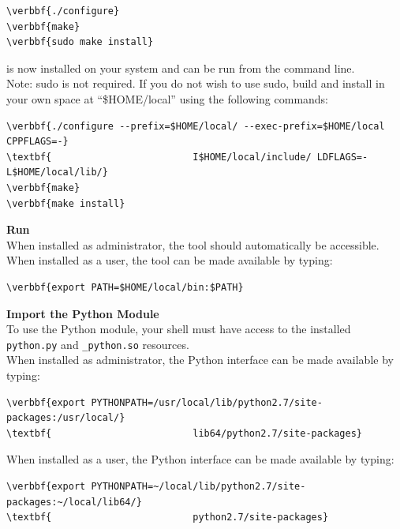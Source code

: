 \documentclass[11pt,fleqn]{article} %
\begin{document}
\begin{Verbatim}[commandchars=\\\{\}]
\verbbf{./configure}
\verbbf{make}
\verbbf{sudo make install}
\end{Verbatim}
\hdb is now installed on your system and can be run from the command line. \\

Note: sudo is not required. If you do not wish to use sudo,  build and install \hdb in your own space at ``\$HOME/local'' using the following commands:
\begin{Verbatim}[commandchars=\\\{\}]
\verbbf{./configure --prefix=$HOME/local/ --exec-prefix=$HOME/local CPPFLAGS=-}
\textbf{                         I$HOME/local/include/ LDFLAGS=-L$HOME/local/lib/}
\verbbf{make}
\verbbf{make install}
\end{Verbatim}

\textbf{Run \hdb}\\
When installed as administrator, the \hdb tool should automatically be accessible. When installed as a user, the \hdb tool can be made available by typing:
\begin{Verbatim}[commandchars=\\\{\}]
\verbbf{export PATH=$HOME/local/bin:$PATH}
\end{Verbatim}

\textbf{Import the Python \hdb Module}\\
To use the Python \hdb module, your shell must have access to the installed \verb+python.py+ and \verb+_python.so+ resources.\\

When installed as administrator, the \hdb Python interface can be made available by typing:
\begin{Verbatim}[commandchars=\\\{\}]
\verbbf{export PYTHONPATH=/usr/local/lib/python2.7/site-packages:/usr/local/}
\textbf{                         lib64/python2.7/site-packages}
\end{Verbatim}

When installed as a user, the \hdb Python interface can be made available by typing:
\begin{Verbatim}[commandchars=\\\{\}]
\verbbf{export PYTHONPATH=~/local/lib/python2.7/site-packages:~/local/lib64/}
\textbf{                         python2.7/site-packages}
\end{Verbatim}
\end{document}
